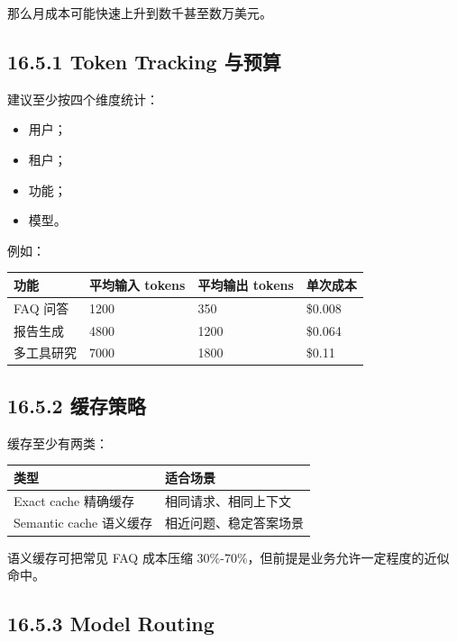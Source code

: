那么月成本可能快速上升到数千甚至数万美元。


\subsection{16.5.1 Token Tracking 与预算}

建议至少按四个维度统计：


\begin{itemize}[leftmargin=2em]
\item 用户；
\item 租户；
\item 功能；
\item 模型。
\end{itemize}

例如：


\begingroup
\scriptsize
\setlength{\tabcolsep}{3pt}
\begin{longtable}{|p{}|p{}|p{}|p{}|}
\hline
功能 & 平均输入 tokens & 平均输出 tokens & 单次成本 \\ \hline
FAQ 问答 & 1200 & 350 & \$0.008 \\ \hline
报告生成 & 4800 & 1200 & \$0.064 \\ \hline
多工具研究 & 7000 & 1800 & \$0.11 \\ \hline
\end{longtable}
\endgroup

\subsection{16.5.2 缓存策略}

缓存至少有两类：


\begingroup
\scriptsize
\setlength{\tabcolsep}{3pt}
\begin{longtable}{|p{}|p{}|}
\hline
类型 & 适合场景 \\ \hline
Exact cache 精确缓存 & 相同请求、相同上下文 \\ \hline
Semantic cache 语义缓存 & 相近问题、稳定答案场景 \\ \hline
\end{longtable}
\endgroup

语义缓存可把常见 FAQ 成本压缩 30\%-70\%，但前提是业务允许一定程度的近似命中。


\subsection{16.5.3 Model Routing}

